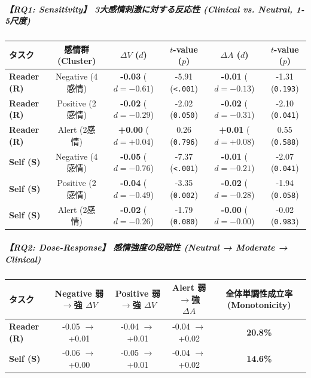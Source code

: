 \subparagraph{【RQ1: Sensitivity】 3大感情刺激に対する反応性 (Clinical vs. Neutral, 1-5尺度)}
\begin{center}
\small
\begin{tabular}{lccccc}
\toprule
\textbf{タスク} & \textbf{感情群 (Cluster)} & \textbf{$\Delta V$ ($d$)} & \textbf{$t$-value ($p$)} & \textbf{$\Delta A$ ($d$)} & \textbf{$t$-value ($p$)} \\
\midrule
\textbf{Reader (R)} & Negative (4感情) & \textbf{-0.03} ($d=-0.61$) & -5.91 (\texttt{<.001}) & \textbf{-0.01} ($d=-0.13$) & -1.31 (\texttt{0.193}) \\
\textbf{Reader (R)} & Positive (2感情) & \textbf{-0.02} ($d=-0.29$) & -2.02 (\texttt{0.050}) & \textbf{-0.02} ($d=-0.31$) & -2.10 (\texttt{0.041}) \\
\textbf{Reader (R)} & Alert (2感情) & \textbf{+0.00} ($d=+0.04$) & 0.26 (\texttt{0.796}) & \textbf{+0.01} ($d=+0.08$) & 0.55 (\texttt{0.588}) \\
\textbf{Self (S)} & Negative (4感情) & \textbf{-0.05} ($d=-0.76$) & -7.37 (\texttt{<.001}) & \textbf{-0.01} ($d=-0.21$) & -2.07 (\texttt{0.041}) \\
\textbf{Self (S)} & Positive (2感情) & \textbf{-0.04} ($d=-0.49$) & -3.35 (\texttt{0.002}) & \textbf{-0.02} ($d=-0.28$) & -1.94 (\texttt{0.058}) \\
\textbf{Self (S)} & Alert (2感情) & \textbf{-0.02} ($d=-0.26$) & -1.79 (\texttt{0.080}) & \textbf{-0.00} ($d=-0.00$) & -0.02 (\texttt{0.983}) \\
\bottomrule
\end{tabular}
\end{center}


\subparagraph{【RQ2: Dose-Response】 感情強度の段階性 (Neutral → Moderate → Clinical)}
\begin{center}
\small
\begin{tabular}{lcccc}
\toprule
\textbf{タスク} & \textbf{Negative 弱$\rightarrow$強 $\Delta V$} & \textbf{Positive 弱$\rightarrow$強 $\Delta V$} & \textbf{Alert 弱$\rightarrow$強 $\Delta A$} & \textbf{全体単調性成立率 (Monotonicity)} \\
\midrule
\textbf{Reader (R)} & -0.05 $\rightarrow$ +0.01 & -0.04 $\rightarrow$ +0.01 & -0.04 $\rightarrow$ +0.02 & \textbf{20.8\%} \\
\textbf{Self (S)} & -0.06 $\rightarrow$ +0.00 & -0.05 $\rightarrow$ +0.01 & -0.04 $\rightarrow$ +0.02 & \textbf{14.6\%} \\
\bottomrule
\end{tabular}
\end{center}


